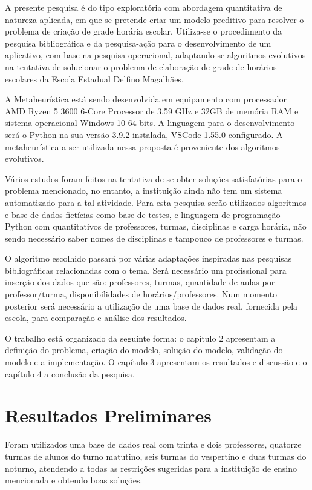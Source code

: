 \documentclass[
	12pt,				%
	openright,			%
	oneside,			%
	a4paper,			%
	english,			%
	french,				%
	spanish,			%
	brazil				%
	]{unimontes-ppgmsc-abntex2}
\begin{document}
A presente pesquisa é do tipo exploratória com abordagem quantitativa de natureza aplicada, em que se pretende criar um modelo preditivo para resolver o problema de criação de grade horária escolar. Utiliza-se o procedimento da pesquisa bibliográfica e da pesquisa-ação para o desenvolvimento de um aplicativo, com base na pesquisa operacional, adaptando-se algoritmos evolutivos na tentativa de solucionar o problema de elaboração de grade de horários escolares da Escola Estadual Delfino Magalhães.

A Metaheurística está sendo desenvolvida em equipamento com processador AMD Ryzen 5 3600 6-Core Processor de 3.59 GHz e 32GB de memória RAM e sistema operacional Windows 10 64 bits. A linguagem para o desenvolvimento será o Python na sua versão 3.9.2 instalada, VSCode 1.55.0 configurado. A metaheurística a ser utilizada nessa proposta é proveniente dos algoritmos evolutivos.

	Vários estudos foram feitos na tentativa de se obter soluções satisfatórias para o problema mencionado, no entanto, a instituição ainda não tem um sistema automatizado para a tal atividade. Para esta pesquisa serão utilizados algoritmos e base de dados fictícias como base de testes, e linguagem de programação Python com quantitativos de professores, turmas, disciplinas e carga horária, não sendo necessário saber nomes de disciplinas e tampouco de professores e turmas.
	
O algoritmo escolhido passará por várias adaptações inspiradas nas pesquisas bibliográficas relacionadas com o tema. Será necessário um profissional para inserção dos dados que são: professores, turmas, quantidade de aulas por professor/turma, disponibilidades de horários/professores. Num momento posterior será necessário a utilização de uma base de dados real, fornecida pela escola, para comparação e análise dos resultados.
 
O trabalho está organizado da seguinte forma: o capítulo 2 apresentam a definição do problema, criação do modelo, solução do modelo, validação do modelo e a implementação. O capítulo 3 apresentam os resultados e discussão e o capítulo 4 a conclusão da pesquisa. 

\section{Resultados Preliminares}
\label{sec:resultados}

Foram utilizados uma base de dados real com trinta e dois professores, quatorze turmas de alunos do turno matutino, seis turmas do vespertino e duas turmas do noturno, atendendo a todas as restrições sugeridas para a instituição de ensino mencionada e obtendo boas soluções.
\end{document}
